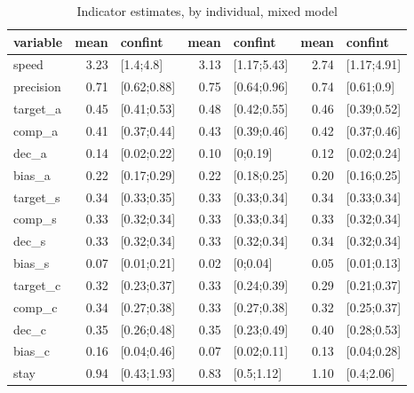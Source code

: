 \begin{table}

\caption{\label{tab:}Indicator estimates, by individual, mixed model}
\centering
\begin{tabular}[t]{lrlrlrl}
\toprule
variable & mean & confint & mean & confint & mean & confint\\
\midrule
speed & 3.23 & [1.4;4.8] & 3.13 & [1.17;5.43] & 2.74 & [1.17;4.91]\\
precision & 0.71 & [0.62;0.88] & 0.75 & [0.64;0.96] & 0.74 & [0.61;0.9]\\
target_a & 0.45 & [0.41;0.53] & 0.48 & [0.42;0.55] & 0.46 & [0.39;0.52]\\
comp_a & 0.41 & [0.37;0.44] & 0.43 & [0.39;0.46] & 0.42 & [0.37;0.46]\\
dec_a & 0.14 & [0.02;0.22] & 0.10 & [0;0.19] & 0.12 & [0.02;0.24]\\
\addlinespace
bias_a & 0.22 & [0.17;0.29] & 0.22 & [0.18;0.25] & 0.20 & [0.16;0.25]\\
target_s & 0.34 & [0.33;0.35] & 0.33 & [0.33;0.34] & 0.34 & [0.33;0.34]\\
comp_s & 0.33 & [0.32;0.34] & 0.33 & [0.33;0.34] & 0.33 & [0.32;0.34]\\
dec_s & 0.33 & [0.32;0.34] & 0.33 & [0.32;0.34] & 0.34 & [0.32;0.34]\\
bias_s & 0.07 & [0.01;0.21] & 0.02 & [0;0.04] & 0.05 & [0.01;0.13]\\
\addlinespace
target_c & 0.32 & [0.23;0.37] & 0.33 & [0.24;0.39] & 0.29 & [0.21;0.37]\\
comp_c & 0.34 & [0.27;0.38] & 0.33 & [0.27;0.38] & 0.32 & [0.25;0.37]\\
dec_c & 0.35 & [0.26;0.48] & 0.35 & [0.23;0.49] & 0.40 & [0.28;0.53]\\
bias_c & 0.16 & [0.04;0.46] & 0.07 & [0.02;0.11] & 0.13 & [0.04;0.28]\\
stay & 0.94 & [0.43;1.93] & 0.83 & [0.5;1.12] & 1.10 & [0.4;2.06]\\
\bottomrule
\end{tabular}
\end{table}
